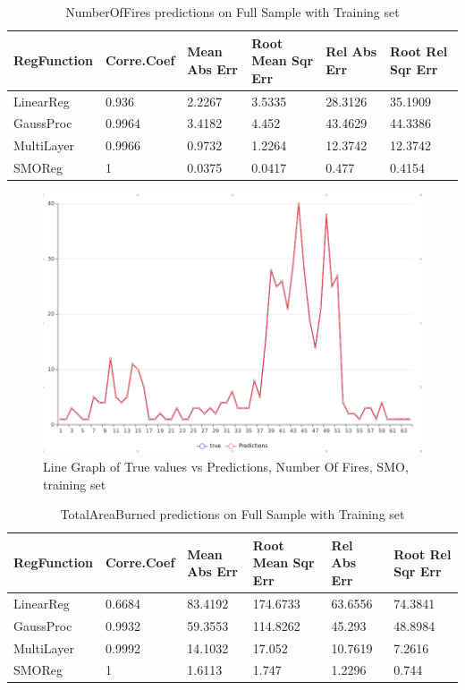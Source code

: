 \documentclass[runningheads]{llncs}
\begin{document}
\begin{table}[H]
\caption{NumberOfFires predictions on Full Sample with Training set}\label{tab2}
\begin{tabular}{|l|l|l|l|l|l|}
\hline
RegFunction & Corre.\break Coef & Mean Abs Err & Root Mean Sqr Err & Rel Abs Err &Root Rel Sqr Err\\
\hline
LinearReg & 0.936  & 2.2267 & 3.5335 & 28.3126  & 35.1909  \\
GaussProc & 0.9964 &3.4182& 4.452  & 43.4629 & 44.3386 \\
MultiLayer & 0.9966 & 0.9732 & 1.2264& 12.3742 & 12.3742\\
SMOReg & 1 &  0.0375 &0.0417 &   0.477 &  0.4154 \\
\hline
\end{tabular}
\end{table}
\begin{figure}[H]
    \caption{Line Graph of True values vs Predictions, Number Of Fires, SMO, training set}\label{LGN}
    \centerline{\includegraphics[width=1\columnwidth]{imagens/LineGraphNumber.png}}
\end{figure}

\begin{table}[H]
\caption{TotalAreaBurned predictions on Full Sample with Training set}\label{tab3}
\begin{tabular}{|l|l|l|l|l|l|}
\hline
RegFunction & Corre.\break Coef & Mean Abs Err & Root Mean Sqr Err & Rel Abs Err &Root Rel Sqr Err\\
\hline
LinearReg & 0.6684  & 83.4192 & 174.6733 &  63.6556 & 74.3841  \\
GaussProc &  0.9932 & 59.3553 & 114.8262 & 45.293 & 48.8984 \\
MultiLayer & 0.9992 & 14.1032 & 17.052 & 10.7619 & 7.2616\\
SMOReg & 1 &  1.6113 & 1.747 & 1.2296 & 0.744 \\
\hline
\end{tabular}
\end{table}
\end{document}
